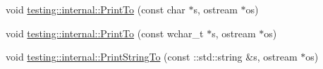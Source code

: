 \begin{DoxyCompactItemize}
\item 
void \mbox{\hyperlink{namespacetesting_1_1internal_adc6c98306d40b53fd07be4e295102a0a}{testing\+::internal\+::\+Print\+To}} (const char $\ast$s, ostream $\ast$os)
\item 
void \mbox{\hyperlink{namespacetesting_1_1internal_afc20fb56b2547a8f91f9ff99650f2024}{testing\+::internal\+::\+Print\+To}} (const wchar\+\_\+t $\ast$s, ostream $\ast$os)
\item 
void \mbox{\hyperlink{namespacetesting_1_1internal_ad609167d8d6792b0fb186539e0e159bd}{testing\+::internal\+::\+Print\+String\+To}} (const \+::std\+::string \&s, ostream $\ast$os)
\end{DoxyCompactItemize}
